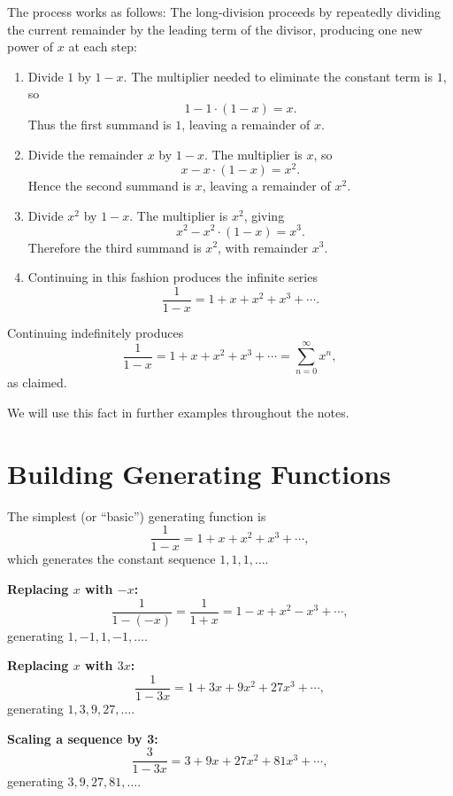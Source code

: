 \documentclass[docmute]{article}
\begin{document}
The process works as follows:
The long‑division proceeds by repeatedly dividing the current remainder by the leading term of the divisor, producing one new power of \(x\) at each step:

\begin{enumerate}
  \item Divide \(1\) by \(1-x\). The multiplier needed to eliminate the constant term is \(1\), so 
  \[
    1 - 1\cdot(1-x) = x.
  \]
  Thus the first summand is \(1\), leaving a remainder of \(x\).

  \item Divide the remainder \(x\) by \(1-x\). The multiplier is \(x\), so
  \[
    x - x\cdot(1-x) = x^2.
  \]
  Hence the second summand is \(x\), leaving a remainder of \(x^2\).

  \item Divide \(x^2\) by \(1-x\). The multiplier is \(x^2\), giving
  \[
    x^2 - x^2\cdot(1-x) = x^3.
  \]
  Therefore the third summand is \(x^2\), with remainder \(x^3\).

  \item Continuing in this fashion produces the infinite series
  \[
    \frac{1}{1-x} = 1 + x + x^2 + x^3 + \cdots.
  \]
\end{enumerate}


Continuing indefinitely produces
\[
\frac{1}{1-x} = 1 + x + x^2 + x^3 + \cdots = \sum_{n=0}^\infty x^n,
\]
as claimed. \par
\noindent We will use this fact in further examples throughout the notes.

\section{Building Generating Functions}\label{sec:gf-building}

The simplest (or “basic”) generating function is
\[
\frac{1}{1-x} = 1 + x + x^2 + x^3 + \cdots,
\]
which generates the constant sequence \(1,1,1,\dots\).

\medskip
\noindent
\textbf{Replacing \(x\) with \(-x\):}
\[
\frac{1}{1-(-x)} = \frac{1}{1+x} = 1 - x + x^2 - x^3 + \cdots,
\]
generating \(1,-1,1,-1,\dots\).

\medskip
\noindent
\textbf{Replacing \(x\) with \(3x\):}
\[
\frac{1}{1-3x} = 1 + 3x + 9x^2 + 27x^3 + \cdots,
\]
generating \(1,3,9,27,\dots\).

\medskip
\noindent
\textbf{Scaling a sequence by 3:}
\[
\frac{3}{1-3x} = 3 + 9x + 27x^2 + 81x^3 + \cdots,
\]
generating \(3,9,27,81,\dots\).
\end{document}
